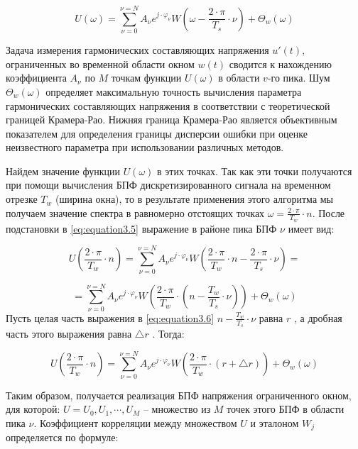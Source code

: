 \begin{equation}
	\label{eq:equation3.5}
	U(\omega) = \displaystyle\sum_{\nu=0}^{\nu=N} A_{\nu} e^{j \cdot \varphi_\nu} W\left( {\omega - \frac{2 \cdot \pi}{T_s} \cdot \nu}\right) + \Theta_w(\omega)  
\end{equation}

Задача измерения гармонических составляющих напряжения $u'(t)$, ограниченных во временной области окном $w(t)$ сводится к нахождению коэффициента $A_\nu$ по $M$ точкам функции $U(\omega)$ в области $v$-го пика. Шум $\Theta_w(\omega) $   определяет максимальную точность вычисления параметра гармонических составляющих напряжения в соответствии с теоретической границей Крамера-Рао. Нижняя граница Крамера-Рао является объективным показателем для определения границы дисперсии ошибки при оценке неизвестного параметра при использовании различных методов. 

Найдем значение функции $U(\omega)$  в этих точках. Так как эти точки получаются при помощи вычисления БПФ дискретизированного сигнала на временном отрезке $T_w$ (ширина окна), то в результате применения этого алгоритма мы получаем значение спектра в равномерно отстоящих точках $ \omega = \frac{2 \cdot \pi}{T_w} \cdot n$. После подстановки   в \ref{eq:equation3.5} выражение в районе пика БПФ $\nu$ имеет вид:

\begin{equation}
	\label{eq:equation3.6}
	U \left(\frac{2 \cdot \pi}{T_w} \cdot n \right) = \displaystyle\sum_{\nu=0}^{\nu=N} A_{\nu} e^{j \cdot \varphi_\nu} W\left( {\frac{2 \cdot \pi}{T_w} \cdot n - \frac{2 \cdot \pi}{T_s} \cdot \nu }\right) = 
\end{equation}

$$
=  \displaystyle\sum_{\nu=0}^{\nu=N} A_{\nu} e^{j \cdot \varphi_\nu} W \left({\frac{2 \cdot \pi}{T_w} \cdot \left( {n - \frac{T_w}{T_s} \cdot \nu} \right) } \right) + \Theta_w(\omega)
$$
Пусть целая часть выражения в \ref{eq:equation3.6} $ n - \frac{T_w}{T_s} \cdot \nu$  равна $r$ , а дробная часть этого выражения равна $ \bigtriangleup r$ . Тогда: 

\begin{equation}
	\label{eq:equation3.7}
	U \left(\frac{2 \cdot \pi}{T_w} \cdot n \right) = \displaystyle\sum_{\nu=0}^{\nu=N} A_{\nu} e^{j \cdot \varphi_\nu} W\left( {\frac{2 \cdot \pi}{T_w} \cdot (r + \bigtriangleup r ) }\right) + \Theta_w(\omega)
\end{equation}

Таким образом, получается реализация БПФ напряжения ограниченного окном, для которой: $U = {U_0, U_1, \cdots , U_M} $ – множество из $M$ точек этого БПФ в области пика $\nu$.
Коэффициент корреляции между множеством $U$ и эталоном $W_j$ определяется по формуле:

